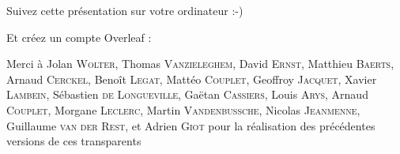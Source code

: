 \begin{frame}
  \begin{center}\Large
  Suivez cette présentation sur votre ordinateur :-)

  \vspace{1cm}


  \vspace{1cm}

  Et créez un compte Overleaf :

  \vspace{1cm}

  \end{center}
\end{frame}


\begin{frame}
  \maketitle
  Merci à Jolan \textsc{Wolter}, Thomas \textsc{Vanzieleghem}, David \textsc{Ernst}, Matthieu \textsc{Baerts},
  Arnaud \textsc{Cerckel}, Benoît \textsc{Legat}, Mattéo \textsc{Couplet}, Geoffroy \textsc{Jacquet},
  Xavier \textsc{Lambein}, Sébastien \textsc{de Longueville}, Gaëtan \textsc{Cassiers}, Louis \textsc{Arys},
  Arnaud \textsc{Couplet}, Morgane \textsc{Leclerc},  Martin \textsc{Vandenbussche}, Nicolas \textsc{Jeanmenne},
  Guillaume \textsc{van der Rest}, et Adrien \textsc{Giot} pour la réalisation des précédentes versions de ces transparents
\end{frame}
